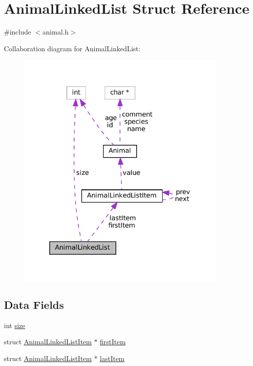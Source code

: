 \hypertarget{struct_animal_linked_list}{}\section{Animal\+Linked\+List Struct Reference}
\label{struct_animal_linked_list}


{\ttfamily \#include $<$animal.\+h$>$}



Collaboration diagram for Animal\+Linked\+List\+:
\nopagebreak
\begin{figure}[H]
\begin{center}
\leavevmode
\includegraphics[width=295pt]{struct_animal_linked_list__coll__graph}
\end{center}
\end{figure}
\subsection*{Data Fields}
\begin{DoxyCompactItemize}
\item 
int \mbox{\hyperlink{struct_animal_linked_list_a28ace4cc471481a60e6a9bb41c9de892}{size}}
\item 
struct \mbox{\hyperlink{struct_animal_linked_list_item}{Animal\+Linked\+List\+Item}} $\ast$ \mbox{\hyperlink{struct_animal_linked_list_a3a2756757903e7f1a69336bc78cc877a}{first\+Item}}
\item 
struct \mbox{\hyperlink{struct_animal_linked_list_item}{Animal\+Linked\+List\+Item}} $\ast$ \mbox{\hyperlink{struct_animal_linked_list_a2bf1bc2b9c4f3d125f61839f4c191def}{last\+Item}}
\end{DoxyCompactItemize}


